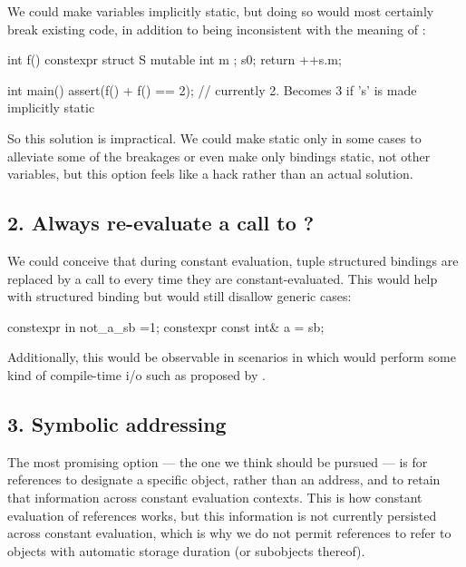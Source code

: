 \documentclass{wg21}
\begin{document}
We could make  variables implicitly static, but
doing so would most certainly break existing code, in addition to being inconsistent with the meaning of :

\begin{colorblock}
int f() {
    constexpr struct S {
        mutable int m ;
    } s{0};
    return ++s.m;
}

int main() {
    assert(f() + f() == 2); // currently 2. Becomes 3 if 's' is made implicitly static
}
\end{colorblock}

So this solution is impractical. We could make  static only in some cases to alleviate some of the breakages or even make only  bindings static, not other variables, but this option feels like a hack rather than an actual solution.

\subsection{2. Always re-evaluate a call to ?}

We could conceive that during constant evaluation, tuple structured bindings are replaced by a call to  every time they are constant-evaluated.
This would help with  structured binding but would still disallow generic cases:

\begin{colorblock}
constexpr in not_a_sb =1;
constexpr const int&  a = sb;
\end{colorblock}

Additionally, this would be observable in scenarios in which  would perform some kind of compile-time i/o such as proposed by .

\subsection{3. Symbolic addressing}

The most promising option --- the one we think should be pursued --- is for  references to designate a specific object, rather than an address,
and to retain that information across constant evaluation contexts.
This is how constant evaluation of references works, but this information is not currently persisted across constant evaluation, which is why we do not permit
 references to refer to objects with automatic storage duration (or subobjects thereof).
\end{document}

